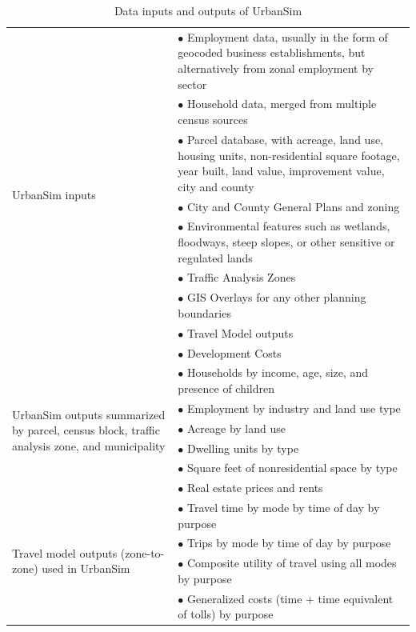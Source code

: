 \begin{table}[htbp]
    \caption{Data inputs and outputs of UrbanSim}
    \label{tab:inputs-outputs}
    \begin{center}
    \begin{tabular}{ p{} p{} }
    \toprule
    
    \multirow{9}{0.25\textwidth}{UrbanSim inputs}
    & $\bullet$ Employment data, usually in the form of geocoded business establishments, but alternatively from zonal employment by sector\\
    & $\bullet$ Household data, merged from multiple census sources\\
    & $\bullet$ Parcel database, with acreage, land use, housing units, non-residential square footage, year built, land value, improvement value, city and county\\
    & $\bullet$ City and County General Plans and zoning\\
    & $\bullet$ Environmental features such as wetlands, floodways, steep slopes, or other sensitive or regulated lands\\
    & $\bullet$ Traffic Analysis Zones\\
    & $\bullet$ GIS Overlays for any other planning boundaries\\
    & $\bullet$ Travel Model outputs\\
    & $\bullet$ Development Costs \\
    
    \midrule
    
    \multirow{6}{0.25\textwidth}{UrbanSim outputs summarized by parcel, census block, traffic analysis zone, and municipality}
    & $\bullet$ Households by income, age, size, and presence of children\\
    & $\bullet$ Employment by industry and land use type\\
    & $\bullet$ Acreage by land use\\
    & $\bullet$ Dwelling units by type\\
    & $\bullet$ Square feet of nonresidential space by type\\
    & $\bullet$ Real estate prices and rents\\
    
    \midrule
    
    \multirow{4}{0.25\textwidth}{Travel model outputs (zone-to-zone) used in UrbanSim}
    & $\bullet$ Travel time by mode by time of day by purpose\\
    & $\bullet$ Trips by mode by time of day by purpose\\
    & $\bullet$ Composite utility of travel using all modes by purpose \\
    & $\bullet$ Generalized costs (time + time equivalent of tolls) by purpose \\
    
    \bottomrule
    \end{tabular}
    \end{center}
\end{table}

